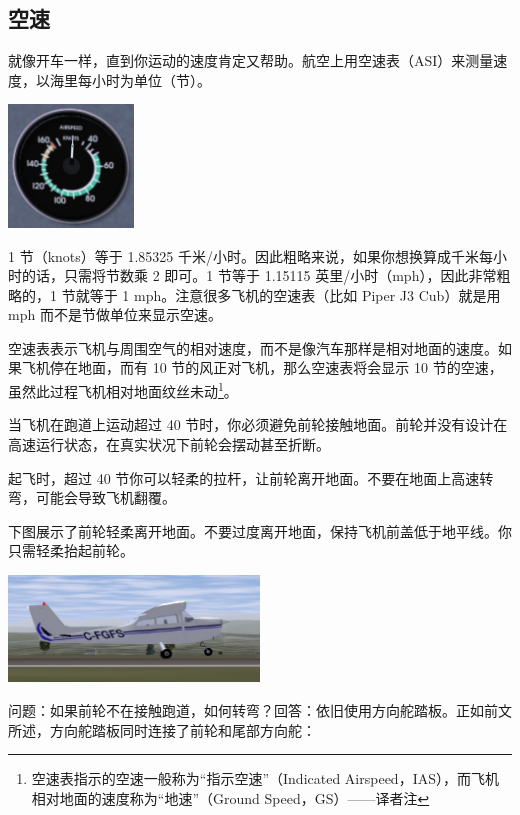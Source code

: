 \subsection{空速}

就像开车一样，直到你运动的速度肯定又帮助。航空上用空速表（ASI）来测量速度，以海里每小时为单位（节）。

\begin{center}
\includegraphics[width=0.25\textwidth]{img/tut_24}
\end{center}

1 节（knots）等于 1.85325 千米/小时。因此粗略来说，如果你想换算成千米每小时的话，只需将节数乘 2 即可。1 节等于 1.15115 英里/小时（mph），因此非常粗略的，1 节就等于 1 mph。注意很多飞机的空速表（比如 Piper J3 Cub）就是用 mph 而不是节做单位来显示空速。

空速表表示飞机与周围空气的相对速度，而不是像汽车那样是相对地面的速度。如果飞机停在地面，而有 10 节的风正对飞机，那么空速表将会显示 10 节的空速，虽然此过程飞机相对地面纹丝未动\footnote{空速表指示的空速一般称为“指示空速”（Indicated Airspeed，IAS），而飞机相对地面的速度称为“地速”（Ground Speed，GS）——译者注}。

当飞机在跑道上运动超过 40 节时，你必须避免前轮接触地面。前轮并没有设计在高速运行状态，在真实状况下前轮会摆动甚至折断。

起飞时，超过 40 节你可以轻柔的拉杆，让前轮离开地面。不要在地面上高速转弯，可能会导致飞机翻覆。

下图展示了前轮轻柔离开地面。不要过度离开地面，保持飞机前盖低于地平线。你只需轻柔抬起前轮。

\begin{center}
\includegraphics[width=0.5\textwidth]{img/tut_25}
\end{center}

问题：如果前轮不在接触跑道，如何转弯？回答：依旧使用方向舵踏板。正如前文所述，方向舵踏板同时连接了前轮和尾部方向舵：

